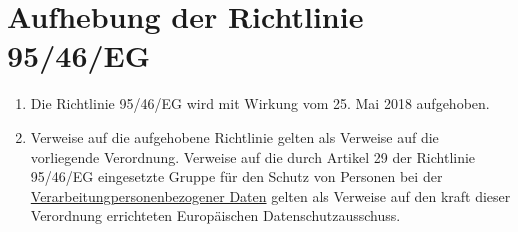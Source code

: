 \chapter{Aufhebung der Richtlinie 95/46/EG}
\label{ch:94}

\begin{enumerate}

  \item Die Richtlinie 95/46/EG wird mit Wirkung vom 25. Mai 2018 aufgehoben.%
  \label{itm:94-1}

  \item Verweise auf die aufgehobene Richtlinie gelten als Verweise auf die vorliegende Verordnung. Verweise auf die
   durch Artikel 29 der Richtlinie 95/46/EG
   eingesetzte Gruppe für den Schutz von Personen bei der \hyperref[itm:04-2]{Verarbeitung}\hyperref[itm:04-1]
   {personenbezogener Daten} gelten als Verweise auf den kraft dieser Verordnung errichteten Europäischen
   Datenschutzausschuss.%
  \label{itm:94-2}

\end{enumerate}




